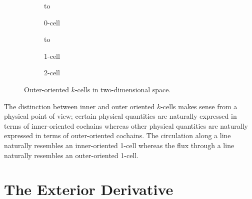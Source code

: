 \begin{figure}[ht]
    \newsavebox\outerBox
    \centering
    \begin{subfigure}[c]{0.3\textwidth}
        \centering
        \vbox to \ht{}
        \caption{0-cell}
    \end{subfigure}
    \begin{subfigure}[c]{0.3\textwidth}
        \centering
        \vbox to \ht{}
        \caption{1-cell}
    \end{subfigure}
    \begin{subfigure}[c]{0.3\textwidth}
        \centering
        \usebox{\outerBox}
        \caption{2-cell}
    \end{subfigure}
    \caption{Outer-oriented $k$-cells in two-dimensional space.}
    \label{fig:outerExample}
\end{figure}

The distinction between inner and outer oriented $k$-cells makes sense from a physical point of view; certain physical quantities are naturally expressed in terms of inner-oriented cochains whereas other physical quantities are naturally expressed in terms of outer-oriented cochains. The circulation along a line naturally resembles an inner-oriented 1-cell whereas the flux through a line naturally resembles an outer-oriented 1-cell.

\section{The Exterior Derivative}

